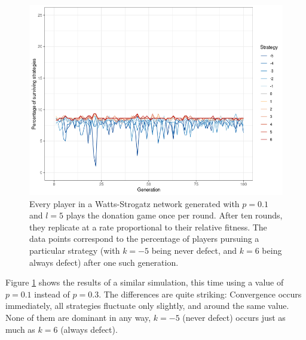 \documentclass{JASSS}
\begin{document}
\begin{figure}
	\centering
	\includegraphics[width=\linewidth]{./figures/results_WS_N300_truthful_new_default.png}
	\caption{Every player in a Watts-Strogatz network generated with $p=0.1$ and $l=5$ plays the donation game once per round. After ten rounds, they replicate at a rate proportional to their relative fitness. The data points correspond to the percentage of players pursuing a particular strategy (with $k=-5$ being never defect, and $k=6$ being always defect) after one such generation.}
	\label{WS_300_default}
\end{figure}

Figure \ref{WS_300_default} shows the results of a similar simulation, this time using a value of $p=0.1$ instead of $p=0.3$. The differences are quite striking: Convergence occurs immediately, all strategies fluctuate only slightly, and around the same value. None of them are dominant in any way, $k=-5$ (never defect) occurs just as much as $k=6$ (always defect).
\end{document}
